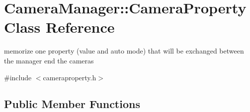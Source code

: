 \hypertarget{class_camera_manager_1_1_camera_property}{}\section{Camera\+Manager\+::Camera\+Property Class Reference}
\label{class_camera_manager_1_1_camera_property}


memorize one property (value and auto mode) that will be exchanged between the manager end the cameras  




{\ttfamily \#include $<$cameraproperty.\+h$>$}

\subsection*{Public Member Functions}
